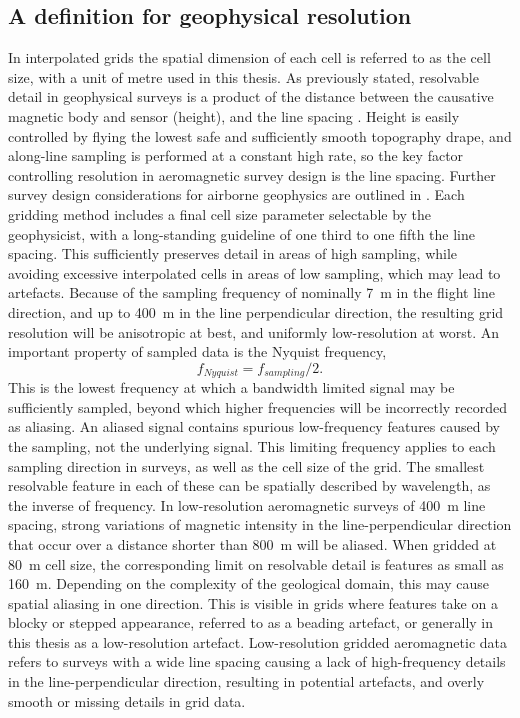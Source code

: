 \documentclass[manuscript.tex]{subfiles}
\begin{document}
\subsection{A definition for geophysical resolution}
In interpolated grids the spatial dimension of each cell is referred to as the cell size, with a unit of metre used in this thesis.
As previously stated, resolvable detail in geophysical surveys is a product of the distance between the causative magnetic body and sensor (height), and the line spacing \parencite{islesRelationshipsGeologicalResolution1992,islesGeologicalInterpretationAeromagnetic2018,dentithGeophysicsMineralExploration2014}.
Height is easily controlled by flying the lowest safe and sufficiently smooth topography drape, and along-line sampling is performed at a constant high rate, so the key factor controlling resolution in aeromagnetic survey design is the line spacing.
Further survey design considerations for airborne geophysics are outlined in \textcite{goodwinAirborneMagneticRadiometric2023,islesGeologicalInterpretationAeromagnetic2018,reidAeromagneticSurveyDesign1980}.
Each gridding method includes a final cell size parameter selectable by the geophysicist, with a long-standing guideline of one third to one fifth the line spacing.
This sufficiently preserves detail in areas of high sampling, while avoiding excessive interpolated cells in areas of low sampling, which may lead to artefacts.
Because of the sampling frequency of nominally \qty{7}{\m} in the flight line direction, and  up to \qty{400}{\m} in the line perpendicular direction, the resulting grid resolution will be anisotropic at best, and uniformly low-resolution at worst.
An important property of sampled data is the Nyquist frequency, \[f_{Nyquist} = f_{sampling} / 2.\]
This is the lowest frequency at which a bandwidth limited signal may be sufficiently sampled, beyond which higher frequencies will be incorrectly recorded as aliasing.
An aliased signal contains spurious low-frequency features caused by the sampling, not the underlying signal.
This limiting frequency applies to each sampling direction in surveys, as well as the cell size of the grid.
The smallest resolvable feature in each of these can be spatially described by wavelength, as the inverse of frequency.
In low-resolution aeromagnetic surveys of \qty{400}{\m} line spacing, strong variations of magnetic intensity in the line-perpendicular direction  that occur over a distance shorter than \qty{800}{\m} will be aliased.
When gridded at \qty{80}{\m} cell size, the corresponding limit on resolvable detail is features as small as \qty{160}{\m}.
Depending on the complexity of the geological domain, this may cause spatial aliasing in one direction.
This is visible in grids where features take on a blocky or stepped appearance, referred to as a beading artefact, or generally in this thesis as a low-resolution artefact.
Low-resolution gridded aeromagnetic data refers to surveys with a wide line spacing causing a lack of high-frequency details in the line-perpendicular direction, resulting in potential artefacts, and overly smooth or missing details in grid data.
\end{document}
